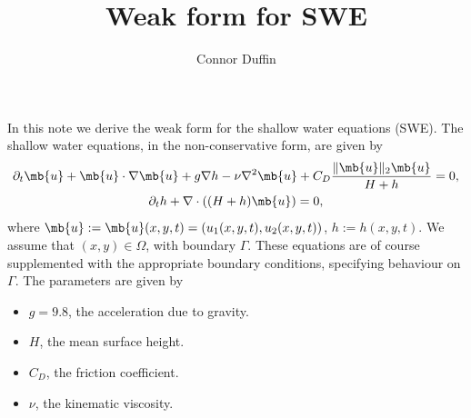 \documentclass[11pt]{article}
\title{Weak form for SWE}
\author{Connor Duffin}
\begin{document}
\maketitle

In this note we derive the weak form for the shallow water equations (SWE). The
shallow water equations, in the non-conservative form, are given by
\begin{gather*}
  \partial_t \mb{u} + \mb{u} \cdot \nabla \mb{u} + g \nabla h - \nu \nabla^2 \mb{u} + C_D
  \frac{\lVert \mb{u} \rVert_2 \mb{u}}{H + h} = 0, \\
  \partial_t h + \nabla \cdot \left( (H + h) \mb{u} \right) = 0,
\end{gather*}
where $\mb{u} := \mb{u}(x, y, t) = (u_1(x, y, t), u_2(x, y, t))$, $h := h(x, y, t)$.
We assume that $(x, y) \in \Omega$, with boundary $\Gamma$. These equations are
of course supplemented with the appropriate boundary conditions, specifying
behaviour on $\Gamma$. The parameters are given by
\begin{itemize}
\item $g = 9.8$, the acceleration due to gravity.
\item $H$, the mean surface height.
\item $C_D$, the friction coefficient.
\item $\nu$, the kinematic viscosity.
\end{itemize}
\end{document}
